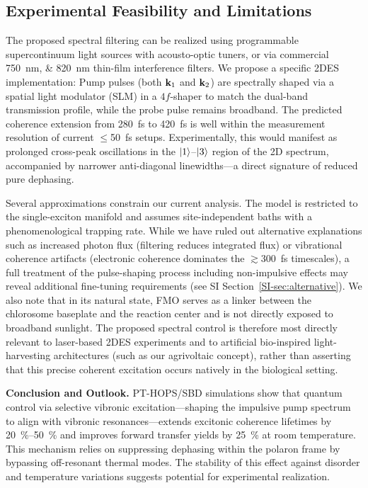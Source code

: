 \documentclass[journal=jpcl,manuscript=letter]{achemso}
\begin{document}
\subsection*{Experimental Feasibility and Limitations}

The proposed spectral filtering can be realized using programmable supercontinuum light sources with acousto-optic tuners,\cite{Gunthardt2023} or via commercial \SIlist{750;820}{\nano\meter} thin-film interference filters. We propose a specific 2DES implementation:\cite{Sebastian2024} Pump pulses (both $\vb{k}_1$ and $\vb{k}_2$) are spectrally shaped via a spatial light modulator (SLM) in a $4f$-shaper to match the dual-band transmission profile, while the probe pulse remains broadband.
The predicted coherence extension from \SI{280}{\femto\second} to \SI{420}{\femto\second} is well within the measurement resolution of current $\leq$\SI{50}{\femto\second} setups.\cite{Engel2007} Experimentally, this would manifest as prolonged cross-peak oscillations in the $\ket{1}$--$\ket{3}$ region of the 2D spectrum, accompanied by narrower anti-diagonal linewidths—a direct signature of reduced pure dephasing. 

Several approximations constrain our current analysis. The model is restricted to the single-exciton manifold and assumes site-independent baths with a phenomenological trapping rate. While we have ruled out alternative explanations such as increased photon flux (filtering reduces integrated flux) or vibrational coherence artifacts (electronic coherence dominates the $\gtrsim$\SI{300}{\femto\second} timescales), a full treatment of the pulse-shaping process including non-impulsive effects may reveal additional fine-tuning requirements (see SI Section~\ref{SI-sec:alternative}). We also note that in its natural state, FMO serves as a linker between the chlorosome baseplate and the reaction center and is not directly exposed to broadband sunlight.\cite{Blankenship2011} The proposed spectral control is therefore most directly relevant to laser-based 2DES experiments and to artificial bio-inspired light-harvesting architectures (such as our agrivoltaic concept), rather than asserting that this precise coherent excitation occurs natively in the biological setting.

\textbf{Conclusion and Outlook.}
PT-HOPS/SBD simulations show that quantum control via selective vibronic excitation---shaping the impulsive pump spectrum to align with vibronic resonances---extends excitonic coherence lifetimes by \SIrange{20}{50}{\percent} and improves forward transfer yields by \SI{25}{\percent} at room temperature. This mechanism relies on suppressing dephasing within the polaron frame by bypassing off-resonant thermal modes. The stability of this effect against disorder and temperature variations suggests potential for experimental realization.
\end{document}
